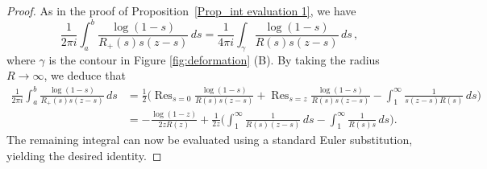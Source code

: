 \documentclass{amsart}
\DeclareMathOperator{\Res}{Res}
\theoremstyle{plain}
\theoremstyle{remark}
\numberwithin{equation}{section}
\begin{document}
\begin{proof}
    As in the proof of Proposition~\ref{Prop_int evaluation 1}, we have 
    \begin{equation}
        \frac{1}{2\pi i}\int_a^b \frac{\log(1-s)}{R_+(s)s(z-s)} \, ds  = \frac{1}{4\pi i}\int_\gamma \frac{\log(1-s)}{R(s)s(z-s)}\,ds\,,
    \end{equation}
    where $\gamma$ is the contour in Figure \ref{fig:deformation} (B). By taking the radius $R\to\infty$, we deduce that
    \begin{equation}
    \begin{split}
         \frac{1}{2\pi i}\int_a^b \frac{\log(1-s)}{R_+(s)s(z-s)} \, ds &  = \frac{1}{2} \bigg(\Res_{s=0} \frac{\log(1-s)}{R(s)s(z-s)} + \Res_{s=z} \frac{\log(1-s)}{R(s)s(z-s)} - \int_1^\infty\frac{1}{s(z-s)R(s)} \, ds \bigg)
         \\
         & = -\frac{\log(1-z)}{2zR(z)}+ \frac{1}{2z} \bigg(\int_1^{\infty} \frac{1}{R(s)(z-s)}\, ds -  \int_1^{\infty} \frac{1}{R(s)s}\,ds\bigg). 
    \end{split}
    \end{equation}
The remaining integral can now be evaluated using a standard Euler substitution, yielding the desired identity. 
\end{proof}
 
\end{document}
